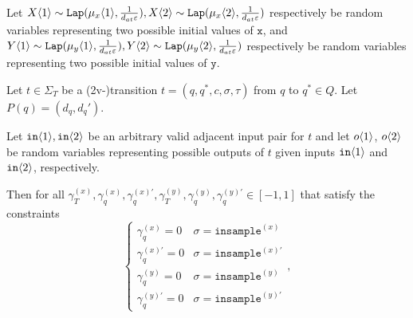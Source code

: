 \begin{lemma}\label{mvIndTransitionCoupling}
    Let $X\langle1 \rangle\sim \texttt{Lap}(\mu_x\langle1 \rangle, \frac{1}{d_{at}\varepsilon}), X\langle2 \rangle\sim\texttt{Lap}(\mu_x\langle2 \rangle, \frac{1}{d_{at}\varepsilon})$ respectively be random variables representing two possible initial values of $\texttt{x}$, 
    and $Y\langle1 \rangle\sim \texttt{Lap}(\mu_y\langle1 \rangle, \frac{1}{d_{at}\varepsilon}), Y\langle2 \rangle\sim\texttt{Lap}(\mu_y\langle2 \rangle, \frac{1}{d_{at}\varepsilon})$ respectively be random variables representing two possible initial values of $\texttt{y}$. 

    Let $t\in \Sigma_T$ be a (2v-)transition $t = (q, q^*, c, \sigma, \tau)$ from $q$ to $q^*\in Q$. Let $P(q) = (d_q, d_q')$.

    Let $\texttt{in}\langle1 \rangle, \texttt{in}\langle2 \rangle$ be an arbitrary valid adjacent input pair for $t$ and let $o\langle1 \rangle$, $o\langle2 \rangle$ be random variables representing possible outputs of $t$ given inputs $\texttt{in}\langle1 \rangle$ and $\texttt{in}\langle2 \rangle$, respectively. 

    Then for all $\gamma_T^{(x)}, \gamma_q^{(x)}, \gamma_q^{(x)\prime},\gamma_T^{(y)}, \gamma_q^{(y)}, \gamma_q^{(y)\prime} \in [-1, 1]$ that satisfy the constraints \[
        \begin{cases}
          \gamma_q^{(x)}=0 & \sigma = \texttt{insample}^{(x)}\\
          \gamma_q^{(x)\prime}=0 & \sigma = \texttt{insample}^{(x)\prime}\\
          \gamma_q^{(y)}=0 & \sigma = \texttt{insample}^{(y)}\\
          \gamma_q^{(y)\prime}=0 & \sigma = \texttt{insample}^{(y)\prime}
        \end{cases},
      \]


\end{lemma}
